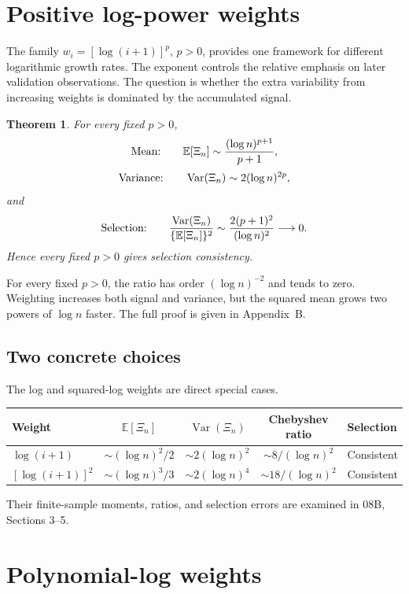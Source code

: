 \documentclass[11pt]{article}
\newtheorem{theorem}{Theorem}[section]
\begin{document}
\section{Positive log-power weights}

The family $w_i=[\log(i+1)]^p$, $p>0$, provides one framework for different
logarithmic growth rates.  The exponent controls the relative emphasis on
later validation observations.  The question is whether the extra
variability from increasing weights is dominated by the accumulated signal.

\begin{theorem}\label{thm:logpower}
For every fixed $p>0$,
\[
\textnormal{Mean:}\qquad
\mathbb E[\Xi_n]\sim\frac{(\log n)^{p+1}}{p+1},
\]
\[
\textnormal{Variance:}\qquad
\operatorname{Var}(\Xi_n)\sim2(\log n)^{2p},
\]
and
\[
\textnormal{Selection:}\qquad
\frac{\operatorname{Var}(\Xi_n)}{\{\mathbb E[\Xi_n]\}^2}
\sim\frac{2(p+1)^2}{(\log n)^2}\longrightarrow0.
\]
Hence every fixed $p>0$ gives selection consistency.
\end{theorem}

For every fixed $p>0$, the ratio has order $(\log n)^{-2}$ and tends to zero.
Weighting increases both signal and variance, but the squared mean grows two
powers of $\log n$ faster.  The full proof is given in Appendix~B.

\subsection{Two concrete choices}

The log and squared-log weights are direct special cases.
\begin{center}
\begin{tabular}{@{}lcccl@{}}
\toprule
Weight & $\mathbb E[\Xi_n]$ & $\operatorname{Var}(\Xi_n)$
& Chebyshev ratio & Selection \\
\midrule
$\log(i+1)$ & $\sim(\log n)^2/2$ & $\sim2(\log n)^2$
& $\sim8/(\log n)^2$ & Consistent \\
$[\log(i+1)]^2$ & $\sim(\log n)^3/3$ & $\sim2(\log n)^4$
& $\sim18/(\log n)^2$ & Consistent \\
\bottomrule
\end{tabular}
\end{center}
Their finite-sample moments, ratios, and selection errors are examined in
08B, Sections 3--5.

\section{Polynomial-log weights}
\end{document}
